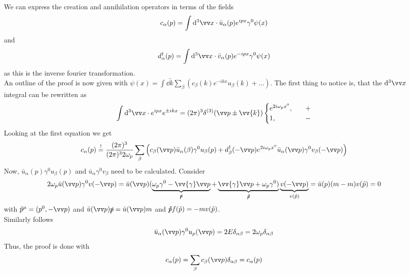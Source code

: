 We can express the creation and annihilation operators in terms of the fields 
\[ c_\alpha(p) = \int \dd^3 \vx \cc \bar u_\alpha (p) e^{ipx} \gamma^0 \psi(x)\]
and 
\[ d_\alpha^\dagger(p) = \int \dd^3 \vx \cc \bar v_\alpha(p) e^{-ipx} \gamma^0 \psi(x)\]
as this is the inverse fourier transformation.\\
An outline of the proof is now given with $\psi(x) = \int \dd \tilde k \sum_\beta\left( c_\beta(k) e^{-ikx} u_\beta(k) + \ldots \right)$.
The first thing to notice is, that the $\dd^3 \vx$ integral can be rewritten as
\[ \int \dd^3 \vx \cc e^{ipx} e^{\pm ikx} = (2\pi)^3 \delta^{(3)}(\vp \pm \vv{k}) \begin{cases} e^{2i\omega_p x^0},~~~ &+ \\ 1, ~~~ &-\end{cases}\]
Looking at the first equation we get
\[ c_\alpha(p) \soll \frac{(2\pi)^3}{(2\pi)^3 2\omega_p} \sum_\beta \left( c_\beta(\vp) \bar u _\alpha(\beta) \gamma^0 u_\beta(p) + d^\dagger_\beta(-\vp) e^{2i\omega_p x^0} \bar u _\alpha(\vp) \gamma^0 v_\beta(-\vp)\right)\]
Now, $ \bar u_\alpha(p) \gamma^0 u_\beta(p)$ and $\bar u_\alpha \gamma^0 v_\beta$ need to be calculated. Consider
\[ 2 \omega_p \bar u (\vp) \gamma^0 v(-\vp) = \bar u (\vp)( \underbrace{ \omega_p \gamma^0 - \vv{\gamma} \vp}_{\slashed p} + \underbrace{ \vv{\gamma} \vp + \omega_p \gamma^0)}_{\slashed{\tilde p}}  \underbrace{v(-\vp)}_{v(\tilde p)} = \bar u (p) (m -m) v(\tilde p) = 0\]
with $ \tilde p ^\mu = ( p^0, -\vp)$ and $\bar u (\vp) \slashed p = \bar u (\vp) m$ and $\slashed{\tilde p} f(\tilde p) = - m v(\tilde p)$.\\
Similarly follows
\[ \bar u _\alpha( \vp) \gamma^0 u _p(\vp) = 2 E \delta_{\alpha\beta} = 2\omega_p \delta_{\alpha\beta}\]
Thus, the proof is done with
\[ c_\alpha(p) = \sum_\beta c_\beta(\vp) \delta_{\alpha \beta} = c_\alpha(p)\]

